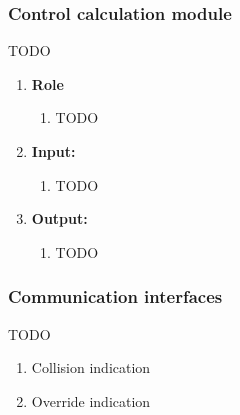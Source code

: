 \subsubsection{Control calculation module}
TODO
\begin{enumerate}[]
	\item \textbf{Role}
	    \begin{enumerate}[]
		    \item TODO
		\end{enumerate}
	\item \textbf{Input:}
	    \begin{enumerate}[1.]
		\item TODO
		\end{enumerate}	
	\item \textbf{Output:}
	    \begin{enumerate}[1.]
		\item TODO
		\end{enumerate}
\end{enumerate}

\subsubsection{Communication interfaces}
TODO
\begin{enumerate}[1.]
    \item Collision indication
	\item Override indication
\end{enumerate}

